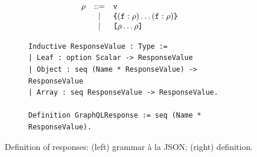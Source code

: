 \begin{figure}[t!]
\centering
\begin{subfigure}{.5\textwidth}

  \begin{displaymath}
	\begin{array}{rcl}
	\rho & ::= & \texttt{v}\\
	& | & \texttt{\{} (\texttt{f} : \rho) \ldots (\texttt{f} : \rho) \texttt{\}} \\
	& | & \texttt{[} \rho \ldots \rho \texttt{]}
	\end{array}
	\end{displaymath}
	
	

 
  \end{subfigure}%
  \begin{subfigure}{.5\textwidth}
\begin{verbatim}
Inductive ResponseValue : Type :=
| Leaf : option Scalar -> ResponseValue
| Object : seq (Name * ResponseValue) -> ResponseValue
| Array : seq ResponseValue -> ResponseValue.
  
Definition GraphQLResponse := seq (Name * ResponseValue).
\end{verbatim}
   
  \end{subfigure}
  \caption{Definition of \gql responses:  (left) grammar à la
    JSON; (right) \gcoql definition.
  }
  \label{fig:response_def}

\end{figure}


